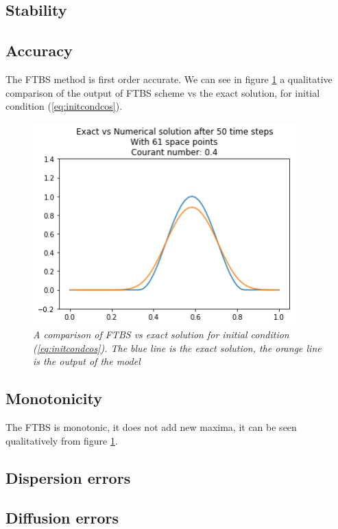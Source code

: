 \subsection{Stability} \label{stabilityftbs}


\subsection{Accuracy}
The FTBS method is first order accurate. We can see in figure \ref{fig:ftbsvsexact} a qualitative comparison of the output of FTBS scheme vs the exact solution, for initial condition (\ref{eq:initcondcos}).
\begin{figure}[H]
	\begin{center}
		\includegraphics[width=4in]{graphics/FTBS_vs_exact.png}
	\end{center}%
	\caption[A comparison of FTBS vs exact solution.]{ \em A comparison of FTBS vs exact solution for initial condition (\ref{eq:initcondcos}). The blue line is the exact solution, the orange line is the output of the model}
	\label{fig:ftbsvsexact}
\end{figure}

\subsection{Monotonicity}
The FTBS is monotonic, it does not add new maxima, it can be seen qualitatively from figure \ref{fig:ftbsvsexact}.

\subsection{Dispersion errors}

\subsection{Diffusion errors}

